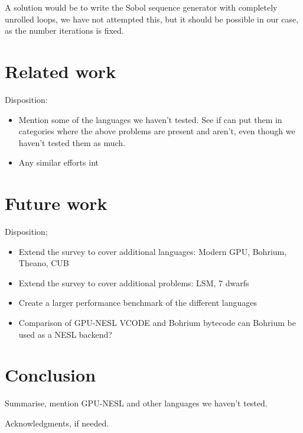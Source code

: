 \documentclass[preprint]{sigplanconf}
\begin{document}
A solution would be to write the Sobol sequence generator with
completely unrolled loops, we have not attempted this, but it should
be possible in our case, as the number iterations is fixed.


\section{Related work}
Disposition:
\begin{itemize}
\item Mention some of the languages we haven't tested. See if can put
  them in categories where the above problems are present and aren't,
  even though we haven't tested them as much.
\item Any similar efforts int
\end{itemize}

\section{Future work}
Disposition;
\begin{itemize}
\item Extend the survey to cover additional languages:
  Modern GPU, Bohrium, Theano, CUB
\item Extend the survey to cover additional problems:
  LSM, 7 dwarfs
\item Create a larger performance benchmark of the different
  languages
\item Comparison of GPU-NESL VCODE and Bohrium bytecode
can Bohrium be used as a NESL backend?
\end{itemize}

\section{Conclusion}
Summarise, mention GPU-NESL and other languages we haven't tested.

\acks

Acknowledgments, if needed.




\end{document}
